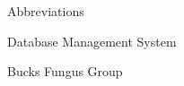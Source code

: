 
\begin{dictionary}{Abbreviations}
\item[DBMS]	Database Management System
\item[BFG]	Bucks Fungus Group
\end{dictionary}
